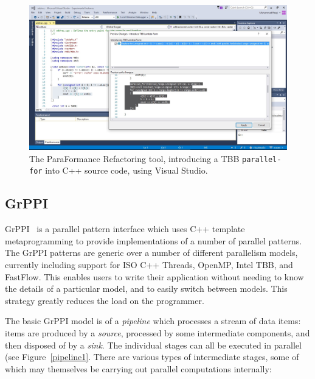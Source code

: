 \begin{figure}
    \centering
    \includegraphics[scale=0.3]{figures/TBBLambda.jpg}
    \caption{The ParaFormance Refactoring tool, introducing a TBB \texttt{parallel-for} into C++ source code, using Visual Studio.}
    \label{fig:paraformance1}
\end{figure}

\subsection{GrPPI}
\label{sec:grppi}

GrPPI~\cite{D24,DBLP:journals/concurrency/AstorgaD0G17} is a parallel pattern interface
which uses C++ template metaprogramming to provide implementations of
a number of parallel patterns.  The GrPPI patterns are generic over a
number of different parallelism models, currently including support for ISO C++ Threads, OpenMP, Intel TBB, and FastFlow.  This enables users to write their application without
needing to know the details of a particular model, and to easily
switch between models.  This strategy greatly reduces the load on the programmer.



The basic GrPPI model is of a \textit{pipeline} which processes a
stream of data items: items are produced by a \textit{source},
processed by some intermediate components, and then disposed of by a
\textit{sink}. The individual stages can all be executed in parallel 
(see Figure~\ref{pipeline1}.  
% 
There are various types of
intermediate stages, some of which may themselves be carrying out
parallel computations internally:  

